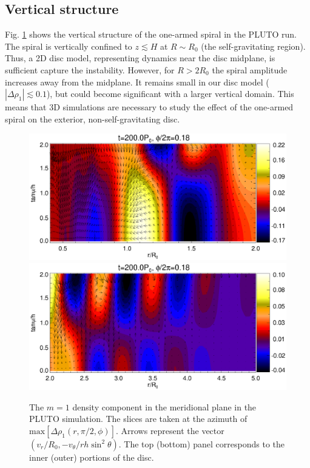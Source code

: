 \subsection{Vertical structure}
Fig. \ref{3d_rz} shows the vertical structure of the one-armed 
spiral in the PLUTO run. The spiral is vertically confined to $z
\lesssim H$ at $R\sim R_0$ (the self-gravitating region). Thus, a 2D
disc model, representing dynamics near the disc midplane, is  
sufficient capture the instability. However, for $R>2R_0$ the spiral amplitude
increases away from the midplane. It remains  
small in our disc model ($|\Delta\rho_1| \lesssim 0.1$), but could become 
significant with a larger vertical domain. This means that 3D 
simulations are necessary to study the effect of the one-armed spiral
on the exterior, non-self-gravitating disc.  
   
\begin{figure}
  \includegraphics[scale=0.47,clip=true,trim=0cm 0.79cm 0cm
  0cm]{figures/pdisk_rz_023_sg}  
  \includegraphics[scale=0.47,clip=true,trim=0cm 0cm 0cm
  0.64cm]{figures/pdisk_rz_023_nsg}  
  \caption{The $m=1$ density component in the meridional plane in the 
    PLUTO simulation. The slices are taken at the azimuth of   
    $\mathrm{max}[\Delta\rho_1(r,\pi/2,\phi)]$. Arrows represent the vector 
    $(v_r/R_0,-v_\theta/rh\sin^2{\theta})$. The top (bottom) panel corresponds
    to the inner (outer) portions of the disc. 
    \label{3d_rz}} 
\end{figure}   

